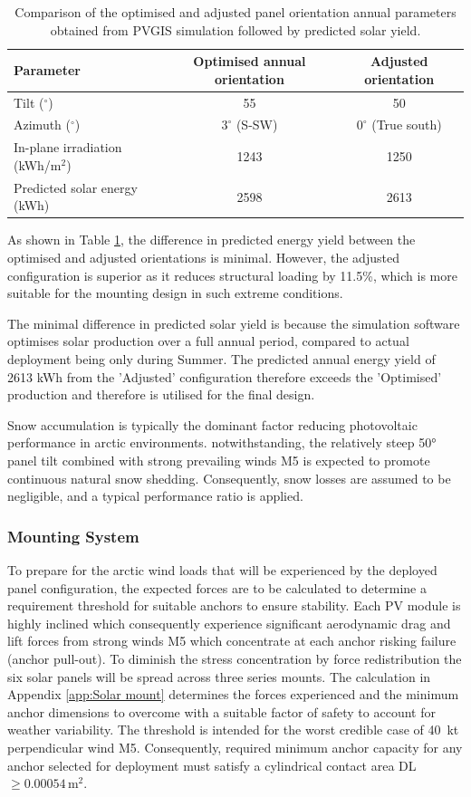 \documentclass[11pt,a4paper]{article}
\begin{document}
\begin{table}[H]
\centering
\begin{tabular}{lcc}
\toprule
Parameter & Optimised annual orientation & Adjusted orientation \\
\midrule
Tilt ($^\circ$) & 55 & 50 \\
Azimuth ($^\circ$) & $3^\circ$ (S-SW) & $0^\circ$ (True south) \\
In-plane irradiation (kWh/m$^2$) & 1243 & 1250 \\
Predicted solar energy (kWh) & 2598 & 2613 \\
\bottomrule
\end{tabular}
\caption{Comparison of the optimised and adjusted panel orientation annual parameters obtained from PVGIS simulation \cite{pvgis} followed by predicted solar yield.}
\label{tab:solar_orientation}
\end{table}

As shown in Table \ref{tab:solar_orientation}, the difference in predicted energy yield between the optimised and adjusted orientations is minimal. However, the adjusted configuration is superior as it reduces structural loading by 11.5\%, which is more suitable for the mounting design in such extreme conditions.

The minimal difference in predicted solar yield is because the simulation software optimises solar production over a full annual period, compared to actual deployment being only during Summer. The predicted annual energy yield of 2613 kWh from the 'Adjusted' configuration therefore exceeds the 'Optimised' production and therefore is utilised for the final design.

Snow accumulation is typically the dominant factor reducing photovoltaic performance in arctic environments. notwithstanding, the relatively steep 50° panel tilt combined with strong prevailing winds M5 is expected to promote continuous natural snow shedding. Consequently, snow losses are assumed to be negligible, and a typical performance ratio is applied.

\subsubsection{Mounting System}
To prepare for the arctic wind loads that will be experienced by the deployed panel configuration, the expected forces are to be calculated to determine a requirement threshold for suitable anchors to ensure stability. Each PV module is highly inclined which consequently experience significant aerodynamic drag and lift forces from strong winds M5 which concentrate at each anchor risking failure (anchor pull-out). To diminish the stress concentration by force redistribution the six solar panels will be spread across three series mounts. The calculation in Appendix \ref{app:Solar mount} determines the forces experienced and the minimum anchor dimensions to overcome with a suitable factor of safety to account for weather variability. The threshold is intended for the worst credible case of 40~kt perpendicular wind M5. Consequently, required minimum anchor capacity for any anchor selected for deployment must satisfy a cylindrical contact area DL $\geq 0.00054\,\text{m}^2$.
\end{document}
